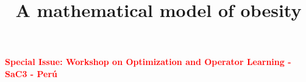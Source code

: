 
\graphicspath{{IMG/ART1/}}






\title{A mathematical model of obesity %
	\\
	\vspace{0.4cm}
}

\autor{}{}{}














\maketitle
\begin{center}
\textcolor{red}{\large \bf Special Issue: Workshop on Optimization and Operator Learning - SaC3 - Perú}	
\end{center}
\vspace{1cm}
	
